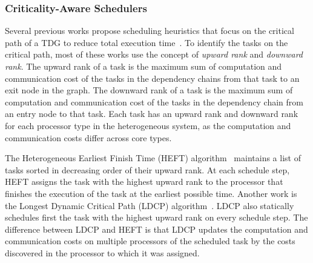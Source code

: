 


\subsubsection{Criticality-Aware Schedulers}
\label{sec.relwork_critical}

Several previous works propose scheduling heuristics that focus on the critical path of a TDG to reduce total execution time~\cite{DCPS, LDCP, HEFT, CrPathDup, Moschakis2015}. To identify the tasks on the critical path, most of these works use the concept of \textit{upward rank} and \textit{downward rank}. The upward rank of a task is the maximum sum of computation and communication cost of the tasks in the dependency chains from that task to an exit node in the graph. The downward rank of a task is the maximum sum of computation and communication cost of the tasks in the dependency chain from an entry node to that task. Each task has an upward rank and downward rank for each processor type in the heterogeneous system, as the computation and communication costs differ across core types.

The Heterogeneous Earliest Finish Time (HEFT) algorithm~\cite{HEFT} maintains a list of tasks sorted in decreasing order of their upward rank. At each schedule step, HEFT assigns the task with the highest upward rank to the processor that finishes the execution of the task at the earliest possible time. Another work is the Longest Dynamic Critical Path (LDCP) algorithm~\cite{LDCP}. LDCP also statically schedules first the task with the highest upward rank on every schedule step. The difference between LDCP and HEFT is that LDCP updates the computation and communication costs on multiple processors of the scheduled task by the costs discovered in the processor to which it was assigned.

